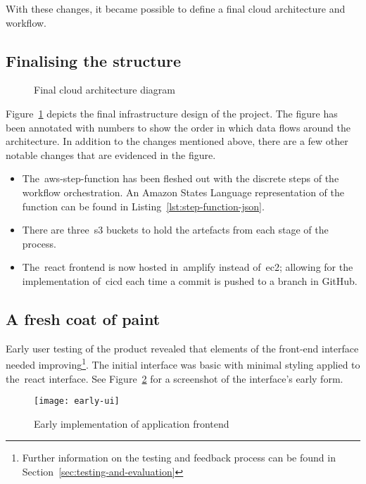 With these changes, it became possible to define a final cloud architecture and workflow.

\subsection{Finalising the structure}\label{subsec:finalising-the-structure}

\begin{figure}[!htb]
    \minipage{\textwidth}
    
    \caption{Final cloud architecture diagram}\label{fig:final_design}
    \endminipage\hfill
\end{figure}

Figure~\ref{fig:final_design} depicts the final infrastructure design of the project.
The figure has been annotated with numbers to show the order in which data flows around the architecture.
In addition to the changes mentioned above, there are a few other notable changes that are evidenced in the figure.

\begin{itemize}
    \item The~\gls{aws-step-function} has been fleshed out with the discrete steps of the workflow orchestration.
    An Amazon States Language representation of the function can be found in Listing~\ref{lst:step-function-json}.
    \item There are three~\gls{s3} buckets to hold the artefacts from each stage of the process.
    \item The~\gls{react} frontend is now hosted in~\gls{amplify} instead of~\gls{ec2};
    allowing for the implementation of~\gls{cicd} each time a commit is pushed to a branch in GitHub.
\end{itemize}

\subsection{A fresh coat of paint}\label{subsec:a-fresh-coat-of-paint}

Early user testing of the product revealed
that elements of the front-end interface needed improving\footnote{Further information on the testing and feedback process can be found in Section~\ref{sec:testing-and-evaluation}}.
The initial interface was basic with minimal styling applied to the~\gls{react} interface.
See Figure~\ref{fig:early-fe} for a screenshot of the interface's early form.

\begin{figure}[!htb]
    \minipage{\textwidth}
    \texttt{[image: early-ui]}
    \caption{Early implementation of application frontend}\label{fig:early-fe}
    \endminipage\hfill
\end{figure}

